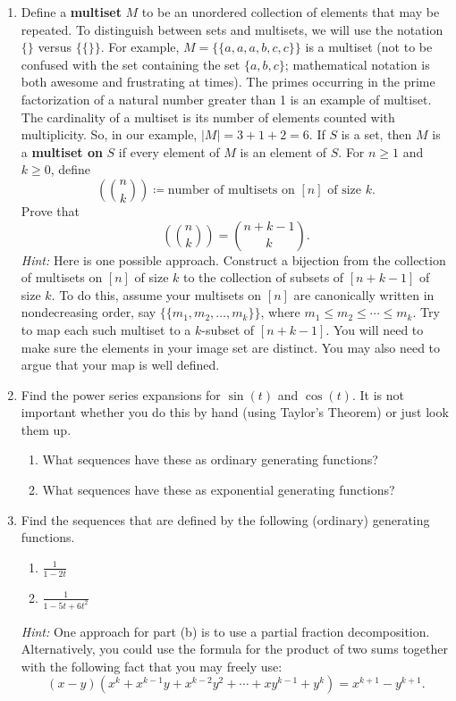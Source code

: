 \documentclass[11pt]{article}%
\theoremstyle{definition}
\begin{document}
\begin{enumerate}
\item Define a \textbf{multiset} $M$ to be an unordered collection of elements that may be repeated.  To distinguish between sets and multisets, we will use the notation $\{\}$ versus $\{\{\}\}$. For example, $M=\{\{a,a,a,b,c,c\}\}$ is a multiset (not to be confused with the set containing the set $\{a,b,c\}$; mathematical notation is both awesome and frustrating at times). The primes occurring in the prime factorization of a natural number greater than 1 is an example of multiset.  The cardinality of a multiset is its number of elements counted with multiplicity.  So, in our example, $|M|=3+1+2=6$.  If $S$ is a set, then $M$ is a \textbf{multiset on} $S$ if every element of $M$ is an element of $S$. For $n\geq 1$ and $k\geq 0$, define
\[
\left(\binom{n}{k}\right)\coloneqq \text{number of multisets on }[n]\text{ of size }k.
\]
Prove that
\[
\left(\binom{n}{k}\right)=\binom{n+k-1}{k}.
\]
\emph{Hint:} Here is one possible approach.  Construct a bijection from the collection of multisets on $[n]$ of size $k$ to the collection of subsets of $[n+k-1]$ of size $k$. To do this, assume your multisets on $[n]$ are canonically written in nondecreasing order, say $\{\{m_1,m_2,\ldots,m_k\}\}$, where $m_1\leq m_2\leq \cdots \leq m_k$.  Try to map each such multiset to a $k$-subset of $[n+k-1]$.  You will need to make sure the elements in your image set are distinct.  You may also need to argue that your map is well defined.

\item Find the power series expansions for $\sin(t)$ and $\cos(t)$. It is not important whether you do this by hand (using Taylor's Theorem) or just look them up.  
\begin{enumerate}
\item What sequences have these as ordinary generating functions?
\item What sequences have these as exponential generating functions?
\end{enumerate}

\item Find the sequences that are defined by the following (ordinary) generating functions.
\begin{enumerate}
\item $\displaystyle \frac{1}{1-2t}$
\item $\displaystyle \frac{1}{1-5t+6t^2}$
\end{enumerate}
\emph{Hint:} One approach for part (b) is to use a partial fraction decomposition.  Alternatively, you could use the formula for the product of two sums together with the following fact that you may freely use:
\[
(x-y)(x^k+x^{k-1}y+x^{k-2}y^2+\cdots +xy^{k-1}+y^k)=x^{k+1}-y^{k+1}.
\]

\end{enumerate}
\end{document}
